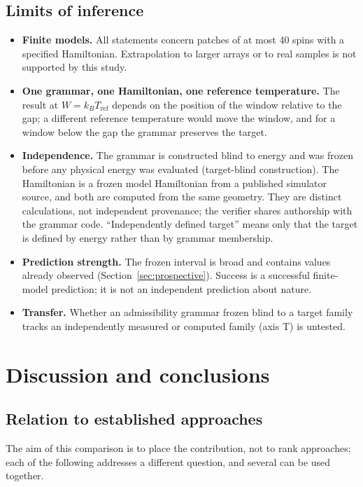 \documentclass[11pt,a4paper]{article}
\theoremstyle{plain}
\theoremstyle{definition}
\theoremstyle{remark}
\newcommand{\kBT}{k_{B}T}
\begin{document}
\subsection{Limits of inference}
\begin{itemize}
\item \textbf{Finite models.} All statements concern patches of at most 40 spins with a specified Hamiltonian. Extrapolation to larger arrays or to real samples is not supported by this study.
\item \textbf{One grammar, one Hamiltonian, one reference temperature.} The result at $W=\kBT_{\mathrm{ref}}$ depends on the position of the window relative to the gap; a different reference temperature would move the window, and for a window below the gap the grammar preserves the target.
\item \textbf{Independence.} The grammar is constructed blind to energy and was frozen before any physical energy was evaluated (target-blind construction). The Hamiltonian is a frozen model Hamiltonian from a published simulator source, and both are computed from the same geometry. They are distinct calculations, not independent provenance; the verifier shares authorship with the grammar code. ``Independently defined target'' means only that the target is defined by energy rather than by grammar membership.
\item \textbf{Prediction strength.} The frozen interval is broad and contains values already observed (Section~\ref{sec:prospective}). Success is a successful finite-model prediction; it is not an independent prediction about nature.
\item \textbf{Transfer.} Whether an admissibility grammar frozen blind to a target family tracks an independently measured or computed family (axis T) is untested.
\end{itemize}

\section{Discussion and conclusions}\label{sec:discussion}

\subsection{Relation to established approaches}
The aim of this comparison is to place the contribution, not to rank approaches; each of the following addresses a different question, and several can be used together.
\end{document}
